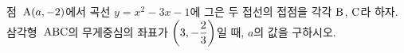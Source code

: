 점~$\mathrm{A}(a{,}\mkern3mu\mathopen{}-2)$에서 곡선 $y=x^2-3x-1$에 그은 두 접선의 접점을 각각 $\mathrm{B}$, $\mathrm{C}$라 하자. 삼각형~$\mathrm{ABC}$의 무게중심의 좌표가 $\left(3{,}\mkern3mu\mathopen{}-\dfrac{2}{3}\right)$일 때, $a$의 값을 구하시오.
